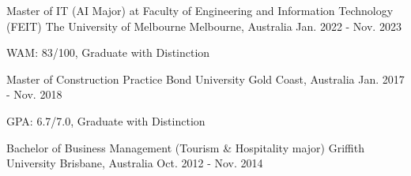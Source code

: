 
\begin{cventries}

  \cventry
    {Master of IT (AI Major) at Faculty of Engineering and Information Technology (FEIT)} %
    {The University of Melbourne} %
    {Melbourne, Australia} %
    {Jan. 2022 - Nov. 2023} %
    {
      \vspace{-3mm}%
      \begin{cvitems} %
        \item {WAM: 83/100, Graduate with Distinction}
      \end{cvitems}
    }

  \cventry
    {Master of Construction Practice} %
    {Bond University} %
    {Gold Coast, Australia} %
    {Jan. 2017 - Nov. 2018} %
    {
      \vspace{-3mm}
      \begin{cvitems} %
        \item {GPA: 6.7/7.0, Graduate with Distinction}
      \end{cvitems}
    }

  \cventry
    {Bachelor of Business Management (Tourism \& Hospitality major)} %
    {Griffith University} %
    {Brisbane, Australia} %
    {Oct. 2012 - Nov. 2014} %
    {}

\end{cventries}
